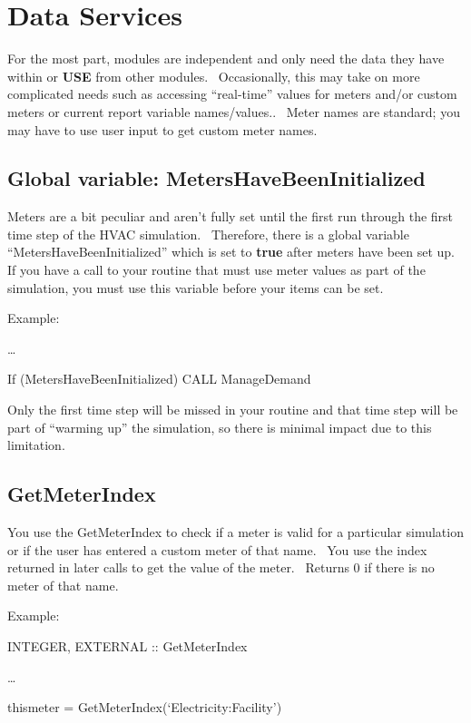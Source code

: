 \section{Data Services}\label{data-services}

For the most part, modules are independent and only need the data they have within or \textbf{USE} from other modules.~ Occasionally, this may take on more complicated needs such as accessing ``real-time'' values for meters and/or custom meters or current report variable names/values..~ Meter names are standard; you may have to use user input to get custom meter names.

\subsection{Global variable: MetersHaveBeenInitialized}\label{global-variable-metershavebeeninitialized}

Meters are a bit peculiar and aren't fully set until the first run through the first time step of the HVAC simulation.~ Therefore, there is a global variable ``MetersHaveBeenInitialized'' which is set to \textbf{true} after meters have been set up.~ If you have a call to your routine that must use meter values as part of the simulation, you must use this variable before your items can be set.

Example:

\ldots{}

If (MetersHaveBeenInitialized) CALL ManageDemand

Only the first time step will be missed in your routine and that time step will be part of ``warming up'' the simulation, so there is minimal impact due to this limitation.

\subsection{GetMeterIndex}\label{getmeterindex}

You use the GetMeterIndex to check if a meter is valid for a particular simulation or if the user has entered a custom meter of that name.~ You use the index returned in later calls to get the value of the meter.~ Returns 0 if there is no meter of that name.

Example:

INTEGER, EXTERNAL :: GetMeterIndex

\ldots{}

thismeter = GetMeterIndex(`Electricity:Facility')

